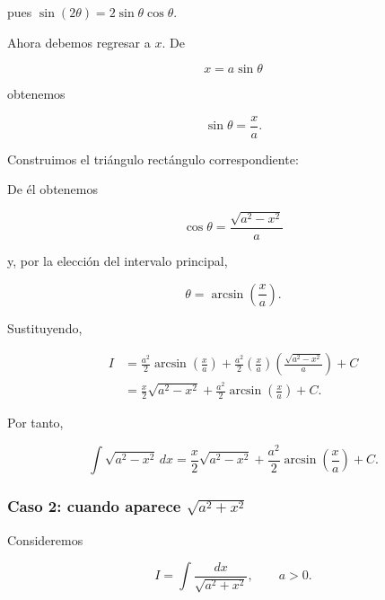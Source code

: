 \documentclass[12pt]{article}
\theoremstyle{definition}
\theoremstyle{remark}
\begin{document}
pues $\sin(2\theta)=2\sin\theta\cos\theta$.

Ahora debemos regresar a $x$. De

\[
x=a\sin\theta
\]

obtenemos

\[
\sin\theta=\frac{x}{a}.
\]

Construimos el triángulo rectángulo correspondiente:

\begin{center}
\end{center}

De él obtenemos

\[
\cos\theta=\frac{\sqrt{a^2-x^2}}{a}
\]

y, por la elección del intervalo principal,

\[
\theta=\arcsin\left(\frac{x}{a}\right).
\]

Sustituyendo,

\begin{align*}
I
&=\frac{a^2}{2}\arcsin\left(\frac{x}{a}\right)
+\frac{a^2}{2}
\left(\frac{x}{a}\right)
\left(\frac{\sqrt{a^2-x^2}}{a}\right)+C\\
&=\frac{x}{2}\sqrt{a^2-x^2}
+\frac{a^2}{2}\arcsin\left(\frac{x}{a}\right)+C.
\end{align*}

Por tanto,

\[
\boxed{
\int\sqrt{a^2-x^2}\,dx
=
\frac{x}{2}\sqrt{a^2-x^2}
+\frac{a^2}{2}\arcsin\left(\frac{x}{a}\right)+C.}
\]

\subsubsection*{Caso 2: cuando aparece \(\sqrt{a^2+x^2}\)}

Consideremos

\[
I=\int\frac{dx}{\sqrt{a^2+x^2}},\qquad a>0.
\]
\end{document}

